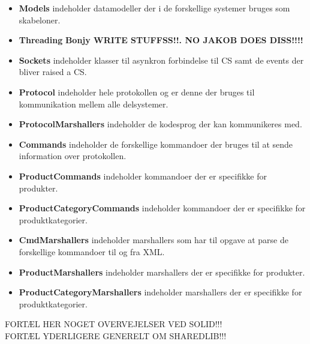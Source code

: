 \begin{itemize}
\item \textbf{Models} indeholder datamodeller der i de forskellige systemer bruges som skabeloner. 
\item \textbf{Threading} \textbf{Bonjy WRITE STUFFSS!!. NO JAKOB DOES DISS!!!!} 
\item \textbf{Sockets} indeholder klasser til asynkron forbindelse til \gls{CS} samt de events der bliver raised a \gls{CS}.
\item \textbf{Protocol} indeholder hele protokollen og er denne der bruges til kommunikation mellem alle delsystemer.
\item \textbf{ProtocolMarshallers} indeholder de kodesprog der kan kommunikeres med.
\item \textbf{Commands} indeholder de forskellige kommandoer der bruges til at sende information over protokollen.
\item \textbf{ProductCommands} indeholder kommandoer der er specifikke for produkter.
\item \textbf{ProductCategoryCommands} indeholder kommandoer der er specifikke for produktkategorier.
\item \textbf{CmdMarshallers} indeholder marshallers som har til opgave at parse de forskellige kommandoer til og fra XML.
\item \textbf{ProductMarshallers} indeholder marshallers der er specifikke for produkter.
\item \textbf{ProductCategoryMarshallers} indeholder marshallers der er specifikke for produktkategorier.
\end{itemize}

FORTÆL HER NOGET OVERVEJELSER VED SOLID!!!\\

FORTÆL YDERLIGERE GENERELT OM SHAREDLIB!!!\\






